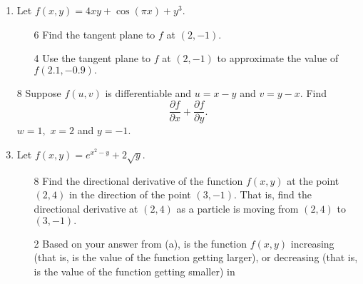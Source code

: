 \documentclass[addpoints,12pt]{exam}
\begin{document}
\begin{enumerate}
\item
Let $f(x,y) = 4xy+\cos(\pi x) + y^3.$
\begin{itemize}
\item[6] Find the tangent plane to $f$ at $(2,-1).$
\vfill
\item[4] Use the tangent plane to $f$ at $(2,-1)$ to approximate the value of $f(2.1, -0.9).$
\vfill
\end{itemize}
\newpage
\item[8] Suppose $f(u,v)$ is differentiable and $u=x-y$ and $v=y-x$. Find $$\dfrac{\partial
f}{\partial x} +\dfrac{\partial f}{\partial y}. $$
$w=1,$ $x=2$ and $y=-1.$
\newpage
\item Let $f(x,y) = e^{x^2 - y} + 2\sqrt{y}$.
\begin{itemize}
\item[8] Find the directional derivative of the function $f(x,y)$ at the point $(2,4)$ in the direction
of the point $(3,-1).$ That is, find the directional derivative at $(2,4)$ as a particle is moving from
$(2,4)$ to $(3,-1).$
\vfill
\vfill
\vfill
\item[2] Based on your answer from (a), is the function $f(x,y)$ increasing (that is, is the value of
the function getting larger), or decreasing (that is, is the value of the function getting smaller) in

\end{itemize}
\end{enumerate}
\end{document}

